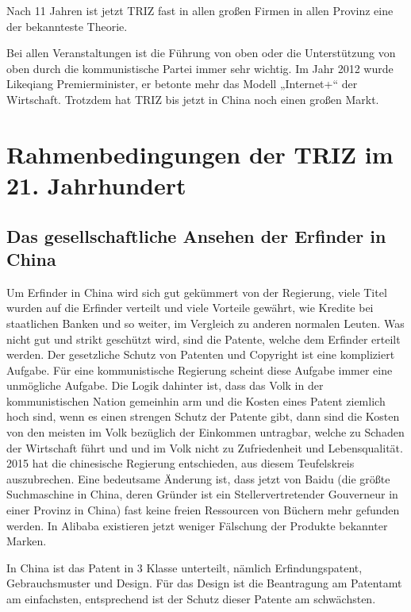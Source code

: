 \documentclass[11pt,a4paper]{article}
\begin{document}
Nach 11 Jahren ist jetzt TRIZ fast in allen großen Firmen in allen Provinz
eine der bekannteste Theorie.

Bei allen Veranstaltungen ist die Führung von oben oder die Unterstützung von
oben durch die kommunistische Partei immer sehr wichtig. Im Jahr 2012 wurde
Likeqiang Premierminister, er betonte mehr das Modell „Internet+“ der
Wirtschaft.  Trotzdem hat TRIZ bis jetzt in China noch einen großen Markt.

\section{Rahmenbedingungen der TRIZ im 21. Jahrhundert}

\subsection{Das gesellschaftliche Ansehen der Erfinder in China}

Um Erfinder in China wird sich gut gekümmert von der Regierung, viele Titel
wurden auf die Erfinder verteilt und viele Vorteile gewährt, wie Kredite bei
staatlichen Banken und so weiter, im Vergleich zu anderen normalen Leuten. Was
nicht gut und strikt geschützt wird, sind die Patente, welche dem Erfinder
erteilt werden. Der gesetzliche Schutz von Patenten und Copyright ist eine
kompliziert Aufgabe. Für eine kommunistische Regierung scheint diese Aufgabe
immer eine unmögliche Aufgabe. Die Logik dahinter ist, dass das Volk in der
kommunistischen Nation gemeinhin arm und die Kosten eines Patent ziemlich hoch
sind, wenn es einen strengen Schutz der Patente gibt, dann sind die Kosten von
den meisten im Volk bezüglich der Einkommen untragbar, welche zu Schaden der
Wirtschaft führt und und im Volk nicht zu Zufriedenheit und Lebensqualität.
2015 hat die chinesische Regierung entschieden, aus diesem Teufelskreis
auszubrechen. Eine bedeutsame Änderung ist, dass jetzt von Baidu (die größte
Suchmaschine in China, deren Gründer ist ein Stellervertretender Gouverneur in
einer Provinz in China) fast keine freien Ressourcen von Büchern mehr gefunden
werden. In Alibaba existieren jetzt weniger Fälschung der Produkte bekannter
Marken.

In China ist das Patent in 3 Klasse unterteilt, nämlich Erfindungspatent,
Gebrauchsmuster und Design. Für das Design ist die Beantragung am Patentamt am
einfachsten, entsprechend ist der Schutz dieser Patente am schwächsten.
\end{document}
